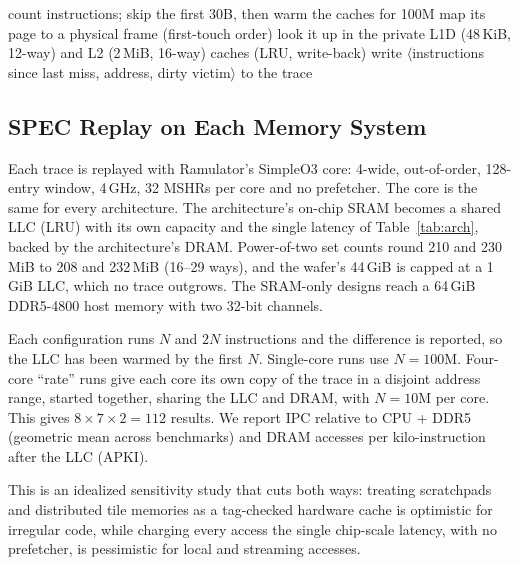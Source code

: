 \documentclass[12pt]{article}
\begin{document}
\begin{algorithm}[H]
\caption{Tracer runtime}
\label{alg:trace}
\begin{algorithmic}[1]
\STATE count instructions; skip the first 30B, then warm the caches for 100M
  \STATE map its page to a physical frame (first-touch order)
  \STATE look it up in the private L1D (48\,KiB, 12-way) and L2 (2\,MiB, 16-way) caches (LRU, write-back)
    \STATE write $\langle$instructions since last miss, address, dirty victim$\rangle$ to the trace
  \ENDIF
\ENDFOR
\end{algorithmic}
\end{algorithm}


\subsection{SPEC Replay on Each Memory System}
Each trace is replayed with Ramulator's SimpleO3 core: 4-wide, out-of-order, 128-entry window, 4\,GHz, 32 MSHRs per core and no prefetcher. The core is the same for every architecture. The architecture's on-chip SRAM becomes a shared LLC (LRU) with its own capacity and the single latency of Table~\ref{tab:arch}, backed by the architecture's DRAM. Power-of-two set counts round 210 and 230\,MiB to 208 and 232\,MiB (16--29 ways), and the wafer's 44\,GiB is capped at a 1\,GiB LLC, which no trace outgrows. The SRAM-only designs reach a 64\,GiB DDR5-4800 host memory with two 32-bit channels.

Each configuration runs $N$ and $2N$ instructions and the difference is reported, so the LLC has been warmed by the first $N$. Single-core runs use $N=100$M. Four-core ``rate'' runs give each core its own copy of the trace in a disjoint address range, started together, sharing the LLC and DRAM, with $N=10$M per core. This gives $8\times7\times2=112$ results. We report IPC relative to CPU + DDR5 (geometric mean across benchmarks) and DRAM accesses per kilo-instruction after the LLC (APKI).

This is an idealized sensitivity study that cuts both ways: treating scratchpads and distributed tile memories as a tag-checked hardware cache is optimistic for irregular code, while charging every access the single chip-scale latency, with no prefetcher, is pessimistic for local and streaming accesses.

\end{document}
